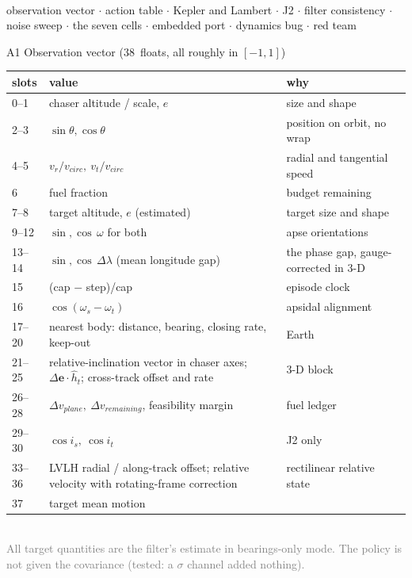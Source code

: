 \documentclass[aspectratio=169,11pt]{beamer}
\newcommand{\dv}{\ensuremath{\Delta v}}
\newcommand{\nObs}{38}
\begin{document}
\appendix
\begin{frame}[plain]
  \\[2mm]
  \small observation vector \;$\cdot$\; action table \;$\cdot$\; Kepler and Lambert \;$\cdot$\; J2 \;$\cdot$\; filter consistency \;$\cdot$\; noise sweep \;$\cdot$\; the seven cells \;$\cdot$\; embedded port \;$\cdot$\; dynamics bug \;$\cdot$\; red team
\end{frame}

\begin{frame}{A1 \; Observation vector (\nObs\ floats, all roughly in $[-1,1]$)}
\tiny
\begin{tabular}{@{}lll@{}}
\toprule
slots & value & why\\
\midrule
0--1 & chaser altitude / scale, $e$ & size and shape\\
2--3 & $\sin\theta,\cos\theta$ & position on orbit, no wrap\\
4--5 & $v_r/v_{circ},\ v_t/v_{circ}$ & radial and tangential speed\\
6 & fuel fraction & budget remaining\\
7--8 & target altitude, $e$ (estimated) & target size and shape\\
9--12 & $\sin,\cos\,\omega$ for both & apse orientations\\
13--14 & $\sin,\cos\,\Delta\lambda$ (mean longitude gap) & the phase gap, gauge-corrected in 3-D\\
15 & (cap $-$ step)/cap & episode clock\\
16 & $\cos(\omega_s-\omega_t)$ & apsidal alignment\\
17--20 & nearest body: distance, bearing, closing rate, keep-out & Earth\\
21--25 & relative-inclination vector in chaser axes; $\Delta\mathbf e\cdot\hat h_t$; cross-track offset and rate & 3-D block\\
26--28 & $\dv_{plane},\ \dv_{remaining}$, feasibility margin & fuel ledger\\
29--30 & $\cos i_s,\ \cos i_t$ & J2 only\\
33--36 & LVLH radial / along-track offset; relative velocity with rotating-frame correction & rectilinear relative state\\
37 & target mean motion & \\
\bottomrule
\end{tabular}
\\[1mm]\textcolor{grey}{All target quantities are the filter's estimate in bearings-only mode. The policy is not given the covariance (tested: a $\sigma$ channel added nothing).}
\end{frame}
\end{document}
